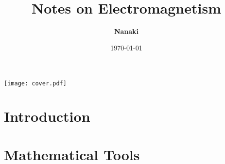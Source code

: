 \documentclass[
    ebook,
    11pt,
    twoside,
    onecolumn,
    openright,
    draft
]{memoir}
\begin{document}
\begin{titlingpage}
    \title{\HUGE\textbf{Notes on Electromagnetism}}
    \author{\Large\textbf{Nanaki}}
    \date{\Large{\today}}

    \maketitle
    \texttt{[image: cover.pdf]}
\end{titlingpage}

\frontmatter

\tableofcontents

\mainmatter

\chapter{Introduction}

\appendix

\chapter{Mathematical Tools}

\backmatter
\end{document}
